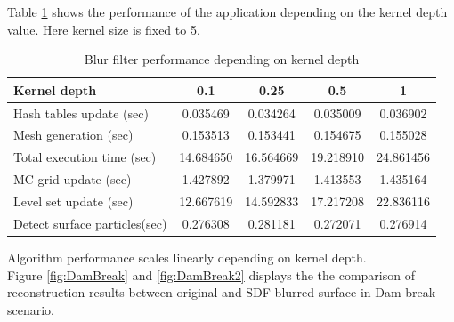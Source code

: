 Table \ref{tab:kd_perf_analysis} shows the performance of the application depending on the kernel depth value. Here kernel size is fixed to 5.
\begin{table}[H]
	\begin{center}
		\scriptsize
		\begin{tabular}{|l|c|c|c|c|}
			\hline
			Kernel depth & 0.1 & 0.25 & 0.5 & 1 \\
			\hline
			Hash tables update (sec)		&	0.035469	&	0.034264	&	0.035009	&	0.036902\\
			Mesh generation	(sec)			&	0.153513	&	0.153441	&	0.154675	&	 0.155028\\
			Total execution time (sec)		&	14.684650	&	16.564669	&	19.218910	&	24.861456\\
			MC grid update (sec)			&	1.427892	&	1.379971	&	1.413553	&	1.435164\\
			Level set update (sec)			&	12.667619	&	14.592833	&	17.217208	&	22.836116\\
			Detect surface particles(sec)	&	0.276308	&	0.281181	&	0.272071	&	0.276914\\
			\hline
		\end{tabular}
	\end{center}
	\caption{Blur filter performance depending on kernel depth}
	\label{tab:kd_perf_analysis}
\end{table}
Algorithm performance scales linearly depending on kernel depth.\\
Figure \ref{fig:DamBreak} and \ref{fig:DamBreak2} displays the  the comparison of reconstruction results between original and SDF blurred surface in Dam break scenario.
